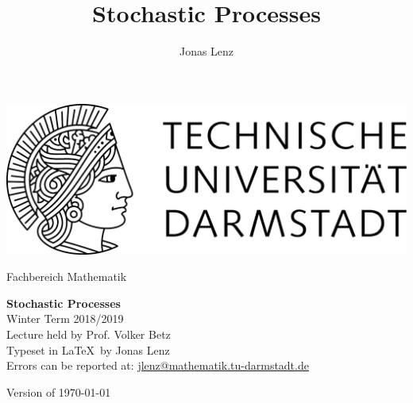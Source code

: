 \documentclass[12pt,a4paper,twoside]{scrreprt}
\title{Stochastic Processes}
\author{Jonas Lenz}
\begin{document}
\begin{titlepage}
  \begin{center}
    \vspace{1cm}
    \includegraphics[width=0.5\linewidth]{TU_Darmstadt_Logo}
    \vspace{1cm}
    
    \large{Fachbereich Mathematik}
    \vspace{3.5cm}
    
    \Huge{\textbf{Stochastic Processes}\\}
    \vspace*{0.5cm}    
    \Large{{Winter Term 2018/2019}\\}
    \vspace*{0.5cm}    
    \small{Lecture held by Prof. Volker Betz\\}
    \vspace*{1.0cm}
    \small{Typeset in \LaTeX\ by Jonas Lenz\\}
    \small{Errors can be reported at: \href{mailto:jlenz@mathematik.tu-darmstadt.de}{jlenz@mathematik.tu-darmstadt.de}}

    \vspace*{\fill}
    \small{Version of \today}
  \end{center}
\end{titlepage}

\cleardoublepage
\tableofcontents

\cleardoublepage
{}



%
%
%
%
\end{document}
